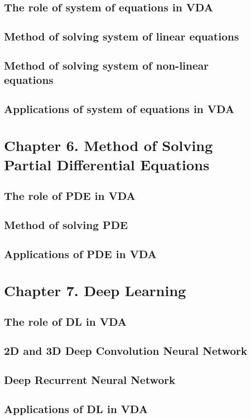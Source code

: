 \subsection{The role of system of equations in VDA}
\subsection{Method of solving system of linear equations}
\subsection{Method of solving system of non-linear equations}
\subsection{Applications of system of equations in VDA}

\section{Chapter 6. Method of Solving Partial Differential Equations}
\subsection{The role of PDE in VDA}
\subsection{Method of solving PDE}
\subsection{Applications of PDE in VDA}

\section{Chapter 7. Deep Learning}
\subsection{The role of DL in VDA}
\subsection{2D and 3D Deep Convolution Neural Network}
\subsection{Deep Recurrent Neural Network}
\subsection{Applications of DL in VDA}

